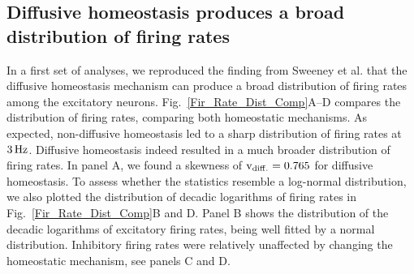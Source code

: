 \documentclass[10pt,letterpaper]{article}
\begin{document}
\subsection*{Diffusive homeostasis produces a broad distribution of firing rates}\label{Fir_Dist_Section}
In a first set of analyses, we reproduced the finding from Sweeney et al. \cite{Sweeney_Paper} that the diffusive homeostasis mechanism can produce a broad distribution of firing rates among the excitatory neurons. Fig.~\ref{Fir_Rate_Dist_Comp}A--D compares the distribution of firing rates, comparing both homeostatic mechanisms. As expected, non-diffusive homeostasis led to a sharp distribution of firing rates at $\rm 3\, Hz$. Diffusive homeostasis indeed resulted in a much broader distribution of firing rates. In panel A, we found a skewness of $\mathrm{v_{\rm diff.} = 0.765}$ for diffusive homeostasis. To assess whether the statistics resemble a log-normal distribution, we also plotted the distribution of decadic logarithms of firing rates in Fig.~\ref{Fir_Rate_Dist_Comp}B and D. Panel B shows the distribution of the decadic logarithms of excitatory firing rates, being well fitted by a normal distribution. Inhibitory firing rates were relatively unaffected by changing the homeostatic mechanism, see panels C and D.  
\end{document}
